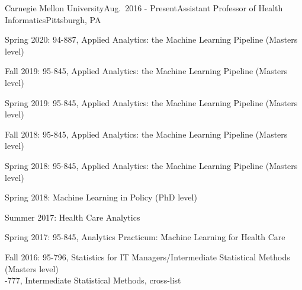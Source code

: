 \begin{rSubsection}{Carnegie Mellon University}{Aug.\ 2016 - Present}{Assistant Professor of Health Informatics}{Pittsburgh, PA}
\item Spring 2020: 94-887, Applied Analytics: the Machine Learning Pipeline (Masters level)
\item Fall 2019: 95-845, Applied Analytics: the Machine Learning Pipeline (Masters level)
\item Spring 2019: 95-845, Applied Analytics: the Machine Learning Pipeline (Masters level)
\item Fall 2018: 95-845, Applied Analytics: the Machine Learning Pipeline (Masters level)
\item Spring 2018: 95-845, Applied Analytics: the Machine Learning Pipeline (Masters level)
\item Spring 2018: Machine Learning in Policy (PhD level)
\item Summer 2017: Health Care Analytics
\item Spring 2017: 95-845, Analytics Practicum: Machine Learning for Health Care
\item Fall 2016: 95-796, Statistics for IT Managers/Intermediate Statistical Methods (Masters level)
  \\ -777, Intermediate Statistical Methods, cross-list
\end{rSubsection}




